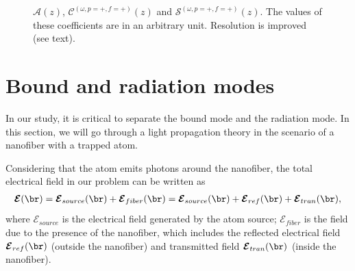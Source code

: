 \documentclass[]{report}
\begin{document}
\begin{figure}[H]
\begin{minipage}{.51\linewidth}
\end{minipage}
\caption{$ \mathcal{A}(z) $, $ \mathcal{C}^{(\omega,p=+,f=+)}(z) $ and $ \mathcal{S}^{(\omega,p=+,f=+)}(z) $. The values of these coefficients are in an arbitrary unit. Resolution is improved (see text).}
\label{ACSz_1}
\end{figure}


\section{Bound and radiation modes}
In our study, it is critical to separate the bound mode and the radiation mode. In this section, we will 
go through a light propagation theory in the scenario of a nanofiber with a trapped atom. 

Considering that the atom emits photons around the nanofiber, the total electrical field in our problem 
can be written as 
\begin{align}\label{Esrt0}
\boldsymbol{\mathcal{E}}(\br) = \boldsymbol{\mathcal{E}}_{source}(\br) + 
\boldsymbol{\mathcal{E}}_{fiber}(\br)=\boldsymbol{\mathcal{E}}_{source}(\br) + 
\boldsymbol{\mathcal{E}}_{ref}(\br) +\boldsymbol{\mathcal{E}}_{tran}(\br),
\end{align}
where $ \boldsymbol{\mathcal{E}}_{source} $ is the electrical field generated by the atom source;  $ 
\boldsymbol{\mathcal{E}}_{fiber} $ is the field due to the presence of the nanofiber, which includes the 
reflected electrical field $ \boldsymbol{\mathcal{E}}_{ref}(\br) $ (outside the nanofiber) and transmitted field $ 
\boldsymbol{\mathcal{E}}_{tran}(\br) $ (inside the nanofiber). 
\end{document}
